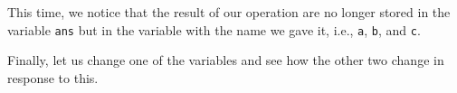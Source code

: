 This time, we notice that the result of our operation are no longer stored in the variable \lstinline{ans} but in the variable with the name we gave it, i.e., \lstinline{a}, \lstinline{b}, and \lstinline{c}.

Finally, let us change one of the variables and see how the other two change in response to this.
